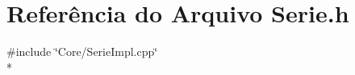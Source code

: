 \section{Referência do Arquivo Serie.\+h}
\label{_core_2_serie_8h}
{\ttfamily \#include \char`\"{}Core/\+Serie\+Impl.\+cpp\char`\"{}}\\*
